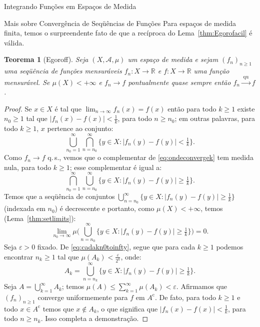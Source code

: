 \documentclass[oneside,final,11pt]{amsbook}
\newcommand{\R}{\mathds R}
\newcommand{\compl}{\mathrm c}
\newcommand{\qs}{\hbox{q.$\,$s.}}
\newcommand{\To}[1]{\xrightarrow{\;\mathrm{#1}\;}}
\theoremstyle{remark}\newtheorem{exercise}{Exercício}[chapter]
\theoremstyle{remark}\newtheorem{*exercise}[exercise]{\hbox to 0pt{\hskip 0pt minus 1fil*}Exercício}
\theoremstyle{definition}\newtheorem{exdefin}{Definição}[chapter]
\theoremstyle{plain}\newtheorem{teo}{Teorema}[section]
\theoremstyle{plain}\newtheorem{lem}[teo]{Lema}
\theoremstyle{plain}\newtheorem{prop}[teo]{Proposição}
\theoremstyle{plain}\newtheorem{cor}[teo]{Corolário}
\theoremstyle{definition}\newtheorem{defin}[teo]{Definição}
\theoremstyle{remark}\newtheorem{rem}[teo]{Observação}
\theoremstyle{definition}\newtheorem{notation}[teo]{Notação}
\theoremstyle{definition}\newtheorem{convention}[teo]{Convenção}
\theoremstyle{definition}\newtheorem{example}[teo]{Exemplo}
\numberwithin{section}{chapter}
\numberwithin{equation}{section}
\begin{document}
\begin{chapter}{Integrando Funções em Espaços de Medida}
\begin{section}{Mais sobre Convergência de Seqüências de Funções}
Para espaços de medida finita, temos o surpreendente fato de que a recíproca do Lema~\ref{thm:Egorofacil}
é válida.
\begin{teo}[Egoroff]
\label{thm:Egoroff}
Seja $(X,\mathcal A,\mu)$ um espaço de medida e sejam $(f_n)_{n\ge1}$ uma seqüência
de funções mensuráveis $f_n:X\to\R$ e $f:X\to\R$ uma função mensurável. Se $\mu(X)<+\infty$
e $f_n\to f$ pontualmente quase sempre então $f_n\To{qu}f$.
\end{teo}
\begin{proof}
Se $x\in X$ é tal que $\lim_{n\to\infty}f_n(x)=f(x)$
então para todo $k\ge1$ existe $n_0\ge1$ tal que $\vert f_n(x)-f(x)\vert<\frac1k$, para todo $n\ge n_0$; em outras
palavras, para todo $k\ge1$, $x$ pertence ao conjunto:
\begin{equation}\label{eq:ondeconvergek}
\bigcup_{n_0=1}^\infty\bigcap_{n=n_0}^{\infty}\big\{y\in X:\big\vert f_n(y)-f(y)\big\vert<\tfrac1k\big\}.
\end{equation}
Como $f_n\to f$ \qs, vemos que o complementar de \eqref{eq:ondeconvergek} tem medida nula,
para todo $k\ge1$; esse complementar é igual a:
\[\bigcap_{n_0=1}^\infty\bigcup_{n=n_0}^\infty\big\{y\in X:\big\vert f_n(y)-f(y)\big\vert\ge\tfrac1k\big\}.\]
Temos que a seqüência de conjuntos $\bigcup_{n=n_0}^\infty\big\{y\in X\!:\!\vert f_n(y)-f(y)\vert\ge\frac1k\big\}$
(indexada em $n_0$) é decrescente e portanto, como $\mu(X)<+\infty$, temos (Lema~\ref{thm:setlimits}):
\begin{equation}\label{eq:cadakn0toinfty}
\lim_{n_0\to\infty}\mu\Big(\bigcup_{n=n_0}^\infty\big\{y\in X:\big\vert f_n(y)-f(y)\big\vert\ge\tfrac1k\big\}\Big)=0.
\end{equation}
Seja $\varepsilon>0$ fixado. De \eqref{eq:cadakn0toinfty}, segue que para cada $k\ge1$ podemos encontrar
$n_k\ge1$ tal que $\mu(A_k)<\frac\varepsilon{2^k}$, onde:
\[A_k=\bigcup_{n=n_k}^\infty\big\{y\in X:\big\vert f_n(y)-f(y)\big\vert\ge\tfrac1k\big\}.\]
Seja $A=\bigcup_{k=1}^\infty A_k$; temos $\mu(A)\le\sum_{k=1}^\infty\mu(A_k)<\varepsilon$.
Afirmamos que $(f_n)_{n\ge1}$ converge uniformemente para $f$ em $A^\compl$. De fato, para todo $k\ge1$
e todo $x\in A^\compl$ temos que $x\not\in A_k$, o que significa que $\vert f_n(x)-f(x)\vert<\frac 1k$,
para todo $n\ge n_k$. Isso completa a demonstração.
\end{proof}


\end{section}
\end{chapter}
\end{document}
